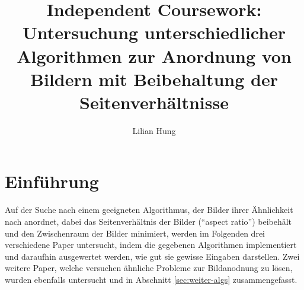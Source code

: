 \documentclass[12pt, ngerman, utf8]{article}
\begin{document}
\title{Independent Coursework:\\Untersuchung unterschiedlicher Algorithmen zur Anordnung von Bildern mit Beibehaltung der Seitenverhältnisse}
\author{Lilian Hung}

\maketitle

\newpage

\tableofcontents 

\lstlistoflistings

\newpage



\section{Einführung}
Auf der Suche nach einem geeigneten Algorithmus, der Bilder ihrer Ähnlichkeit nach anordnet, dabei das Seitenverhältnis der Bilder (``aspect ratio'') beibehält und den Zwischenraum der Bilder minimiert, werden im Folgenden drei verschiedene Paper untersucht, indem die gegebenen Algorithmen implementiert und daraufhin ausgewertet werden, wie gut sie gewisse Eingaben darstellen. Zwei weitere Paper, welche versuchen ähnliche Probleme zur Bildanodnung zu lösen, wurden ebenfalls untersucht und in Abschnitt \ref{sec:weiter-algs} zusammengefasst.
\end{document}
